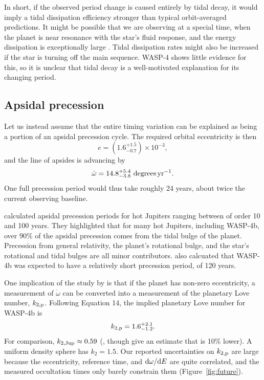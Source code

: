 \documentclass[12pt,twocolumn,tighten]{aastex62}
\begin{document}
In short, if the observed period change is caused entirely by tidal
decay, it would imply a tidal dissipation efficiency stronger than
typical orbit-averaged predictions.  It might be possible that we are
observing at a special time, when the planet is near resonance with
the star's fluid response, and the energy dissipation is exceptionally
large \citep{ogilvie_tidal_2014,essick_orbital_2016}.  Tidal
dissipation rates might also be increased if the star is turning off
the main sequence.  WASP-4 shows little evidence for this, so it is
unclear that tidal decay is a well-motivated explanation for its
changing period.


\subsection{Apsidal precession}
\label{sec:apsidal_precession}

Let us instead assume that the entire timing variation can be
explained as being a portion of an apsidal precession cycle.
The required orbital eccentricity is then
\begin{equation}
  e = (1.6^{+1.5}_{-0.7})\times10^{-3},
\end{equation}
and the line of apsides is advancing by
\begin{equation}
  \dot{\omega} = 14.8^{+5.4}_{-3.8}\ {\rm degrees}\,{\rm yr}^{-1}.
\end{equation}
One full precession period would thus take roughly 24 years, about
twice the current observing baseline.

\citet{ragozzine_probing_2009} calculated apsidal precession periods
for hot Jupiters ranging between of order 10 and 100 years.  They
highlighted that for many hot Jupiters, including WASP-4b, over 90\%
of the apsidal precession comes from the tidal bulge of the planet.
Precession from general relativity, the planet's rotational bulge, and
the star's rotational and tidal bulges are all minor contributors.
\citet{ragozzine_probing_2009} also calcuated that WASP-4b was
expected to have a relatively short precession period, of 120 years.

One implication of the study by \citet{ragozzine_probing_2009} is that
if the planet has non-zero eccentricity, a measurement of
$\dot{\omega}$ can be converted into a measurement of the planetary
Love number, $k_{2,\rm p}$.  Following \citet{ragozzine_probing_2009}
Equation 14, the implied planetary Love number for WASP-4b is
\begin{equation}
k_{2,{\rm p}} = 1.6^{+2.1}_{-1.2}.
\end{equation}
For comparison, $k_{2,{\rm Jup}} \approx 0.59$
(\citealt{wahl_tidal_2016}, though \citealt{ni_empirical_2018} give an
estimate that is 10\% lower).  A uniform density sphere has $k_2 =
1.5$.  Our reported uncertainties on $k_{2,{\rm p}}$ are large because
the eccentricity, reference time, and ${\rm d}\omega/{\rm d}E$ are
quite correlated, and the measured occultation times only barely
constrain them (Figure~\ref{fig:future}).
\end{document}
